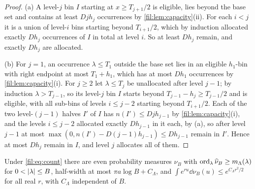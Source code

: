 \begin{proof}
(a) A level-$j$ bin $I$ starting at $x\ge T_{j+1}/2$ is eligible, lies beyond the base set and contains at least
$Djh_j$ occurrences by \cref{fil:lem:capacity}(ii). For each $i<j$ it is a union of level-$i$ bins starting
beyond $T_{i+1}/2$, which by induction allocated exactly $Dh_j$ occurrences of $I$ in total at level $i$. So at
least $Dh_j$ remain, and exactly $Dh_j$ are allocated.

(b) For $j=1$, an occurrence $\lambda\le T_1$ outside the base set lies in an eligible $h_1$-bin with right
endpoint at most $T_1+h_1$, which has at most $Dh_1$ occurrences by \cref{fil:lem:capacity}(i). For $j\ge2$ let
$\lambda\le T_j$ be unallocated after level $j-1$; by induction $\lambda>T_{j-1}$, so its level-$j$ bin $I$ starts
beyond $T_{j-1}-h_j\ge T_{j-1}/2$ and is eligible, with all sub-bins of levels $i\le j-2$ starting beyond
$T_{i+1}/2$. Each of the two level-$(j-1)$ halves $I'$ of $I$ has $n(I')\le Djh_{j-1}$ by
\cref{fil:lem:capacity}(i), and the levels $i\le j-2$ allocated exactly $Dh_{j-1}$ in it each, by (a), so after level
$j-1$ at most $\max(0,n(I')-D(j-1)h_{j-1})\le Dh_{j-1}$ remain in $I'$. Hence at most $Dh_j$ remain in $I$, and
level $j$ allocates all of them.
\end{proof}

\begin{theorem}\label{fil:thm:cancel}
Under \eqref{fil:eq:count} there are even probability measures $\nu_B$ with $\operatorname{ord}_\lambda\widehat\nu_B\ge m_\Lambda(\lambda)$
for $0<\lvert\lambda\rvert\le B$, half-width at most $\pi a\log B+C_\Lambda$, and
$\int e^{ru}\dd\nu_B(u)\le e^{C_\Lambda r^2/2}$ for all real $r$, with $C_\Lambda$ independent of $B$.
\end{theorem}

